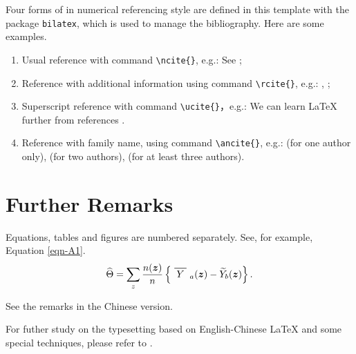 \documentclass[English]{APSart}
\begin{document}
\begin{example}
Four forms of  in numerical referencing style are defined in this template with the package \texttt{bilatex}, which is used to manage the bibliography. Here are some examples. 
\begin{enumerate}[leftmargin=7.8mm,itemsep=-0.1ex,label= \arabic*)]%
\item Usual reference with command \verb|\ncite{}|, e.g.: See ;
\item Reference with additional information using command \verb|\rcite{}|, e.g.: , ;
\item Superscript reference with command \verb|\ucite{}|，e.g.: We can learn \LaTeX{}  further from references .  		
\item Reference with family name, using command \verb|\ancite{}|, e.g.:  (for one author only), (for two authors),  (for at least three authors). 
	\end{enumerate}
\end{example}	

%
\appendix
{}
\makeatletter 
\newcommand{\section@cntformat}{Appdendix \thesection:\ }
\makeatother

\section{Further Remarks}
\begin{remark}
	Equations, tables and figures are numbered separately. See, for example, Equation \eqref{eqn-A1}.
\begin{equation}\label{eqn-A1}
	\widehat{\Theta}=\sum_{z} \frac{n(\boldsymbol{z})}{n}\left\{\widebar{Y}_{a}(\boldsymbol{z})
	-\widetilde{Y}_{b}(\boldsymbol{z})\right\}. 
\end{equation}
	
\end{remark}
\begin{remark}
	See the remarks in the Chinese version.
\end{remark}
\begin{remark}
For futher study on the typesetting based on English-Chinese \LaTeX{} and some special techniques,
please refer to . 
\end{remark}
\end{document}
